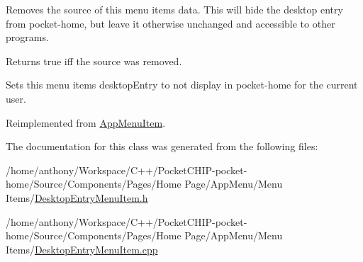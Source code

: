 Removes the source of this menu item\textquotesingle{}s data. This will hide the desktop entry from pocket-\/home, but leave it otherwise unchanged and accessible to other programs.

\begin{DoxyReturn}{Returns}
true iff the source was removed.
\end{DoxyReturn}
Sets this menu items desktop\+Entry to not display in pocket-\/home for the current user. 

Reimplemented from \mbox{\hyperlink{classAppMenuItem_a5a156a436279e0319c7960ac2931b14d}{App\+Menu\+Item}}.



The documentation for this class was generated from the following files\+:\begin{DoxyCompactItemize}
\item 
/home/anthony/\+Workspace/\+C++/\+Pocket\+C\+H\+I\+P-\/pocket-\/home/\+Source/\+Components/\+Pages/\+Home Page/\+App\+Menu/\+Menu Items/\mbox{\hyperlink{DesktopEntryMenuItem_8h}{Desktop\+Entry\+Menu\+Item.\+h}}\item 
/home/anthony/\+Workspace/\+C++/\+Pocket\+C\+H\+I\+P-\/pocket-\/home/\+Source/\+Components/\+Pages/\+Home Page/\+App\+Menu/\+Menu Items/\mbox{\hyperlink{DesktopEntryMenuItem_8cpp}{Desktop\+Entry\+Menu\+Item.\+cpp}}\end{DoxyCompactItemize}
